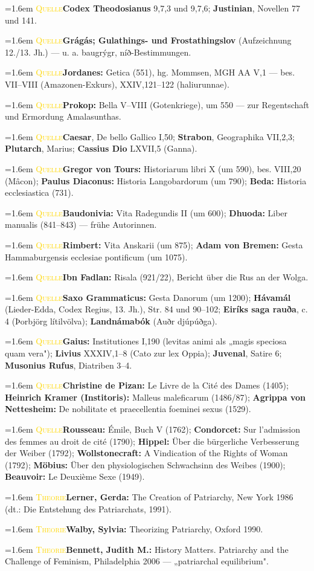 \documentclass[11pt,a4paper,ngerman]{scrartcl}
\newcommand{\litentry}[2]{\par\noindent\hangindent=1.6em\hangafter=1
  {\footnotesize\scshape\textcolor{gold}{#1}}\quad #2\par\smallskip}
\begin{document}
\litentry{Quelle}{\textbf{Codex Theodosianus} 9,7,3 und 9,7,6; \textbf{Justinian}, Novellen 77 und 141.}
\litentry{Quelle}{\textbf{Grágás; Gulathings- und Frostathingslov} (Aufzeichnung 12./13. Jh.) — u. a. baugrýgr, níð-Bestimmungen.}
\litentry{Quelle}{\textbf{Jordanes:} Getica (551), hg. Mommsen, MGH AA V,1 — bes. VII–VIII (Amazonen-Exkurs), XXIV,121–122 (haliurunnae).}
\litentry{Quelle}{\textbf{Prokop:} Bella V–VIII (Gotenkriege), um 550 — zur Regentschaft und Ermordung Amalasunthas.}
\litentry{Quelle}{\textbf{Caesar}, De bello Gallico I,50; \textbf{Strabon}, Geographika VII,2,3; \textbf{Plutarch}, Marius; \textbf{Cassius Dio} LXVII,5 (Ganna).}
\litentry{Quelle}{\textbf{Gregor von Tours:} Historiarum libri X (um 590), bes. VIII,20 (Mâcon); \textbf{Paulus Diaconus:} Historia Langobardorum (um 790); \textbf{Beda:} Historia ecclesiastica (731).}
\litentry{Quelle}{\textbf{Baudonivia:} Vita Radegundis II (um 600); \textbf{Dhuoda:} Liber manualis (841–843) — frühe Autorinnen.}
\litentry{Quelle}{\textbf{Rimbert:} Vita Anskarii (um 875); \textbf{Adam von Bremen:} Gesta Hammaburgensis ecclesiae pontificum (um 1075).}
\litentry{Quelle}{\textbf{Ibn Fadlan:} Risala (921/22), Bericht über die Rus an der Wolga.}
\litentry{Quelle}{\textbf{Saxo Grammaticus:} Gesta Danorum (um 1200); \textbf{Hávamál} (Lieder-Edda, Codex Regius, 13. Jh.), Str. 84 und 90–102; \textbf{Eiríks saga rauða}, c. 4 (Þorbjörg lítilvölva); \textbf{Landnámabók} (Auðr djúpúðga).}
\litentry{Quelle}{\textbf{Gaius:} Institutiones I,190 (levitas animi als „magis speciosa quam vera"); \textbf{Livius} XXXIV,1–8 (Cato zur lex Oppia); \textbf{Juvenal}, Satire 6; \textbf{Musonius Rufus}, Diatriben 3–4.}
\litentry{Quelle}{\textbf{Christine de Pizan:} Le Livre de la Cité des Dames (1405); \textbf{Heinrich Kramer (Institoris):} Malleus maleficarum (1486/87); \textbf{Agrippa von Nettesheim:} De nobilitate et praecellentia foeminei sexus (1529).}
\litentry{Quelle}{\textbf{Rousseau:} Émile, Buch V (1762); \textbf{Condorcet:} Sur l'admission des femmes au droit de cité (1790); \textbf{Hippel:} Über die bürgerliche Verbesserung der Weiber (1792); \textbf{Wollstonecraft:} A Vindication of the Rights of Woman (1792); \textbf{Möbius:} Über den physiologischen Schwachsinn des Weibes (1900); \textbf{Beauvoir:} Le Deuxième Sexe (1949).}
\litentry{Theorie}{\textbf{Lerner, Gerda:} The Creation of Patriarchy, New York 1986 (dt.: Die Entstehung des Patriarchats, 1991).}
\litentry{Theorie}{\textbf{Walby, Sylvia:} Theorizing Patriarchy, Oxford 1990.}
\litentry{Theorie}{\textbf{Bennett, Judith M.:} History Matters. Patriarchy and the Challenge of Feminism, Philadelphia 2006 — „patriarchal equilibrium".}
\end{document}
